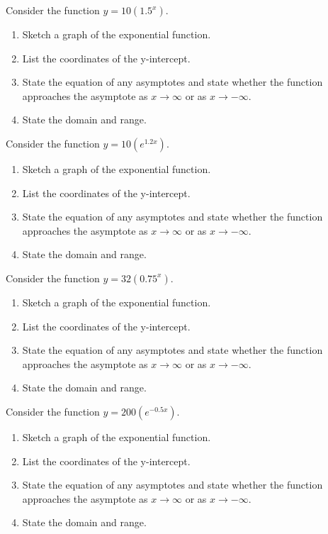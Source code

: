 \begin{puzzle}
    Consider the function \( y = 10(1.5^x) \).
    \begin{enumerate}
        \item Sketch a graph of the exponential function.
        \item List the coordinates of the y-intercept.
        \item State the equation of any asymptotes and state whether the function approaches the asymptote as \( x \to \infty \) or as \( x \to -\infty \).
        \item State the domain and range.
    \end{enumerate}
\end{puzzle}

\begin{puzzle}
    Consider the function \( y = 10(e^{1.2x}) \).
    \begin{enumerate}
        \item Sketch a graph of the exponential function.
        \item List the coordinates of the y-intercept.
        \item State the equation of any asymptotes and state whether the function approaches the asymptote as \( x \to \infty \) or as \( x \to -\infty \).
        \item State the domain and range.
    \end{enumerate}
\end{puzzle}

\begin{puzzle}
    Consider the function \( y = 32(0.75^x) \).
    \begin{enumerate}
        \item Sketch a graph of the exponential function.
        \item List the coordinates of the y-intercept.
        \item State the equation of any asymptotes and state whether the function approaches the asymptote as \( x \to \infty \) or as \( x \to -\infty \).
        \item State the domain and range.
    \end{enumerate}
\end{puzzle}

\begin{puzzle}
    Consider the function \( y = 200(e^{-0.5x}) \).
    \begin{enumerate}
        \item Sketch a graph of the exponential function.
        \item List the coordinates of the y-intercept.
        \item State the equation of any asymptotes and state whether the function approaches the asymptote as \( x \to \infty \) or as \( x \to -\infty \).
        \item State the domain and range.
    \end{enumerate}
\end{puzzle}

